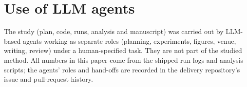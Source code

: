 \documentclass{article}
\begin{document}





\section{Use of LLM agents}
\label{app:llm}
The study (plan, code, runs, analysis and manuscript) was carried out by LLM-based agents working as separate roles (planning, experiments, figures, venue, writing, review) under a human-specified task. They are not part of the studied method. All numbers in this paper come from the shipped run logs and analysis scripts; the agents' roles and hand-offs are recorded in the delivery repository's issue and pull-request history.

\newpage

\end{document}
